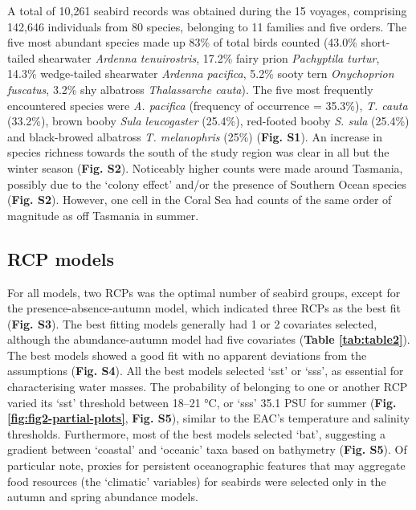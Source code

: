 \documentclass{article}
\begin{document}
A total of 10,261 seabird records was obtained during the 15 voyages, comprising 142,646 individuals from 80 species, belonging to 11 families and five orders. The five most abundant species made up 83\% of total birds counted (43.0\% short-tailed shearwater \emph{Ardenna tenuirostris}, 17.2\% fairy prion \emph{Pachyptila turtur}, 14.3\% wedge-tailed shearwater \emph{Ardenna pacifica}, 5.2\% sooty tern \emph{Onychoprion fuscatus}, 3.2\% shy albatross \emph{Thalassarche cauta}). The five most frequently encountered species were \emph{A. pacifica} (frequency of occurrence = 35.3\%), \emph{T. cauta} (33.2\%), brown booby \emph{Sula leucogaster} (25.4\%), red-footed booby \emph{S. sula} (25.4\%) and black-browed albatross \emph{T. melanophris} (25\%) (\textbf{Fig. S1}). An increase in species richness towards the south of the study region was clear in all but the winter season (\textbf{Fig. S2}). Noticeably higher counts were made around Tasmania, possibly due to the `colony effect' and/or the presence of Southern Ocean species (\textbf{Fig. S2}). However, one cell in the Coral Sea had counts of the same order of magnitude as off Tasmania in summer.

\hypertarget{rcp-models}{%
\subsection{RCP models}\label{rcp-models}}

For all models, two RCPs was the optimal number of seabird groups, except for the presence-absence-autumn model, which indicated three RCPs as the best fit (\textbf{Fig. S3}). The best fitting models generally had 1 or 2 covariates selected, although the abundance-autumn model had five covariates (\textbf{Table \ref{tab:table2}}). The best models showed a good fit with no apparent deviations from the assumptions (\textbf{Fig. S4}). All the best models selected `sst' or `sss', as essential for characterising water masses. The probability of belonging to one or another RCP varied its `sst' threshold between 18--21 °C, or `sss' 35.1 PSU for summer (\textbf{Fig. \ref{fig:fig2-partial-plots}}, \textbf{Fig. S5}), similar to the EAC's temperature and salinity thresholds. Furthermore, most of the best models selected `bat', suggesting a gradient between `coastal' and `oceanic' taxa based on bathymetry (\textbf{Fig. S5}). Of particular note, proxies for persistent oceanographic features that may aggregate food resources (the `climatic' variables) for seabirds were selected only in the autumn and spring abundance models.
\end{document}
